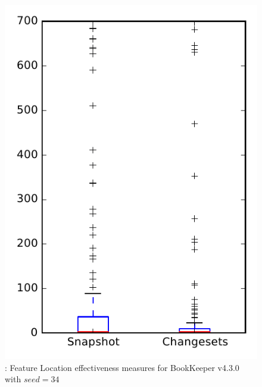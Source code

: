 
\begin{figure}
\centering
\includegraphics[height=0.4\textheight]{figures/flt_seed/rq1_bookkeeper_34}
\caption{\rone: Feature Location effectiveness measures for BookKeeper v4.3.0 with $seed=34$}
\label{fig:flt_seed:rq1:bookkeeper}
\end{figure}
